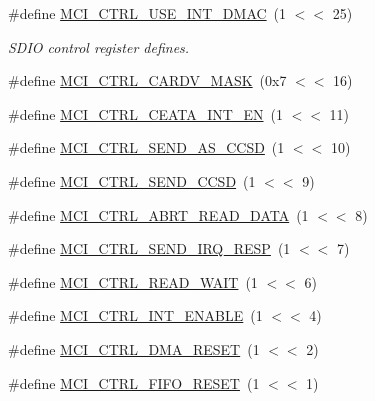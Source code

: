 \begin{DoxyCompactItemize}
\item 
\#define \hyperlink{group___s_d_i_f__18_x_x__43_x_x_ga28b3bc2ecf8fdc0a6b518a86ead9e5fc}{M\+C\+I\+\_\+\+C\+T\+R\+L\+\_\+\+U\+S\+E\+\_\+\+I\+N\+T\+\_\+\+D\+M\+AC}~(1 $<$$<$ 25)
\begin{DoxyCompactList}\small\item\em S\+D\+IO control register defines. \end{DoxyCompactList}\item 
\#define \hyperlink{group___s_d_i_f__18_x_x__43_x_x_ga9e9ffa0b196698b6d4571ee392e23929}{M\+C\+I\+\_\+\+C\+T\+R\+L\+\_\+\+C\+A\+R\+D\+V\+\_\+\+M\+A\+SK}~(0x7 $<$$<$ 16)
\item 
\#define \hyperlink{group___s_d_i_f__18_x_x__43_x_x_ga072fae306e8eefc095a7c3d68d614892}{M\+C\+I\+\_\+\+C\+T\+R\+L\+\_\+\+C\+E\+A\+T\+A\+\_\+\+I\+N\+T\+\_\+\+EN}~(1 $<$$<$ 11)
\item 
\#define \hyperlink{group___s_d_i_f__18_x_x__43_x_x_gaf6ff8cb819c06bbd9845396b50b1b56c}{M\+C\+I\+\_\+\+C\+T\+R\+L\+\_\+\+S\+E\+N\+D\+\_\+\+A\+S\+\_\+\+C\+C\+SD}~(1 $<$$<$ 10)
\item 
\#define \hyperlink{group___s_d_i_f__18_x_x__43_x_x_ga4fc8e1caaee733a9d2a0bae769683203}{M\+C\+I\+\_\+\+C\+T\+R\+L\+\_\+\+S\+E\+N\+D\+\_\+\+C\+C\+SD}~(1 $<$$<$ 9)
\item 
\#define \hyperlink{group___s_d_i_f__18_x_x__43_x_x_ga6198326513e4e0d47e0e35867a08c6c6}{M\+C\+I\+\_\+\+C\+T\+R\+L\+\_\+\+A\+B\+R\+T\+\_\+\+R\+E\+A\+D\+\_\+\+D\+A\+TA}~(1 $<$$<$ 8)
\item 
\#define \hyperlink{group___s_d_i_f__18_x_x__43_x_x_ga30e2082fcbbab6df51889142e90cc927}{M\+C\+I\+\_\+\+C\+T\+R\+L\+\_\+\+S\+E\+N\+D\+\_\+\+I\+R\+Q\+\_\+\+R\+E\+SP}~(1 $<$$<$ 7)
\item 
\#define \hyperlink{group___s_d_i_f__18_x_x__43_x_x_ga540f82481d7536418ffcac66c8269ff0}{M\+C\+I\+\_\+\+C\+T\+R\+L\+\_\+\+R\+E\+A\+D\+\_\+\+W\+A\+IT}~(1 $<$$<$ 6)
\item 
\#define \hyperlink{group___s_d_i_f__18_x_x__43_x_x_gad26e6f6fb616eae0d07ba4cd1305b729}{M\+C\+I\+\_\+\+C\+T\+R\+L\+\_\+\+I\+N\+T\+\_\+\+E\+N\+A\+B\+LE}~(1 $<$$<$ 4)
\item 
\#define \hyperlink{group___s_d_i_f__18_x_x__43_x_x_gaa9c93448750d09f70915258dccb9a3a7}{M\+C\+I\+\_\+\+C\+T\+R\+L\+\_\+\+D\+M\+A\+\_\+\+R\+E\+S\+ET}~(1 $<$$<$ 2)
\item 
\#define \hyperlink{group___s_d_i_f__18_x_x__43_x_x_gad3c531c08f72080f0985867df9f41bfe}{M\+C\+I\+\_\+\+C\+T\+R\+L\+\_\+\+F\+I\+F\+O\+\_\+\+R\+E\+S\+ET}~(1 $<$$<$ 1)
\item 
$$
\end{DoxyCompactItemize}
